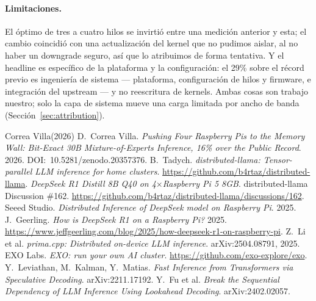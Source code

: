 \documentclass[10pt,a4paper]{article}
\begin{document}
\paragraph{Limitaciones.} El óptimo de tres a cuatro hilos se invirtió entre una medición anterior y esta; el cambio coincidió con una actualización del kernel que no pudimos aislar, al no haber un downgrade seguro, así que lo atribuimos de forma tentativa. Y el headline es específico de la plataforma y la configuración: el 29\% sobre el récord previo es ingeniería de sistema --- plataforma, configuración de hilos y firmware, e integración del upstream --- y no reescritura de kernels. Ambas cosas son trabajo nuestro; solo la capa de sistema mueve una carga limitada por ancho de banda (Sección~\ref{sec:attribution}).

\begin{thebibliography}{Correa Villa(2026)}
\small
{} D.~Correa Villa. \emph{Pushing Four Raspberry Pis to the Memory Wall: Bit-Exact 30B Mixture-of-Experts Inference, 16\% over the Public Record}. 2026. DOI:~10.5281/zenodo.20357376.
 B.~Tadych. \emph{distributed-llama: Tensor-parallel LLM inference for home clusters}. \url{https://github.com/b4rtaz/distributed-llama}.
 \emph{DeepSeek R1 Distill 8B Q40 on 4$\times$Raspberry Pi 5 8GB}. distributed-llama Discussion \#162. \url{https://github.com/b4rtaz/distributed-llama/discussions/162}.
 Seeed Studio. \emph{Distributed Inference of DeepSeek model on Raspberry Pi}. 2025.
 J.~Geerling. \emph{How is DeepSeek R1 on a Raspberry Pi?} 2025. \url{https://www.jeffgeerling.com/blog/2025/how-deepseek-r1-on-raspberry-pi}.
 Z.~Li et al. \emph{prima.cpp: Distributed on-device LLM inference}. arXiv:2504.08791, 2025.
 EXO Labs. \emph{EXO: run your own AI cluster}. \url{https://github.com/exo-explore/exo}.
 Y.~Leviathan, M.~Kalman, Y.~Matias. \emph{Fast Inference from Transformers via Speculative Decoding}. arXiv:2211.17192.
 Y.~Fu et al. \emph{Break the Sequential Dependency of LLM Inference Using Lookahead Decoding}. arXiv:2402.02057.
\end{thebibliography}
\end{document}
